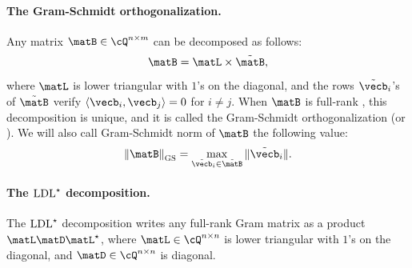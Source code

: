 

\paragraph{The Gram-Schmidt orthogonalization.}
Any matrix $\matB \in \cQ^{n \times m}$ can be decomposed as follows:
\begin{equation}
 \matB = \matL \times \tBB,
\end{equation}
where $\matL$ is lower triangular with $1$'s on the diagonal, and the rows $\tilde \vecb_i$'s of $\tBB$ verify $\inner{\vecb_i}{ \vecb_j} = 0$ for $i \neq j$. When $\matB$ is full-rank , this decomposition is unique, and it is called the Gram-Schmidt orthogonalization (or \gso).
We will also call Gram-Schmidt norm of $\matB$ the following value:
\begin{equation}
 \gsnorm{\matB} = \max_{\tilde\vecb_i \in \tBB} \|\tilde\vecb_i\|.
\end{equation}

\paragraph{The $ \text{LDL}^\star $ decomposition.} The $ \text{LDL}^\star $ decomposition writes any full-rank Gram matrix as a product $\L \matD \adj\L$, where $\matL \in \cQ^{n\times n}$ is lower triangular with $1$'s on the diagonal, and $\matD \in \cQ^{n\times n}$ is diagonal.

